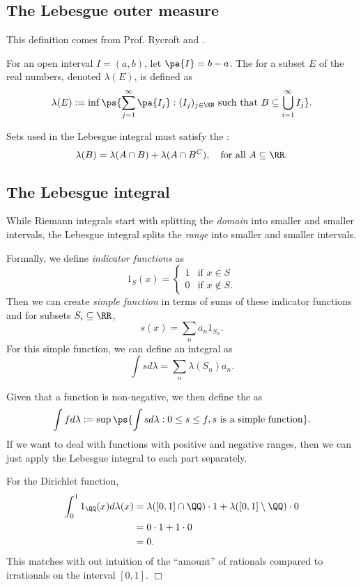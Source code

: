 \documentclass{scrartcl}
\newcommand{\qedwhite}{\hfill \ensuremath{\Box}}
\begin{document}
\subsection{The Lebesgue outer measure}

This definition comes from Prof. Rycroft and 
\cite{nlab:lebesgue_measure}.

\begin{definition}
    For an open interval $I=(a,b)$, let $\pa{I} = b-a$.
    The  for a subset $E$ of the real 
    numbers, denoted $\lambda(E)$, is defined as 
    \[
        \lambda(E) := \inf\ps{\sum_{j=1}^{\infty}\pa{I_j}: (I_j)_{j\in \NN} \text{ such that } B \subseteq \bigcup_{i=1}^\infty I_j}.
    \]
\end{definition}
Sets used in the Lebesgue integral must satisfy the :
\[
    \lambda(B) = \lambda(A\cap B) + \lambda(A\cap B^C), \quad \text{for all }A \subseteq\RR.
\]

\subsection{The Lebesgue integral}

While Riemann integrals start with splitting the \textit{domain} into smaller and smaller intervals, the Lebesgue integral 
splits the \textit{range} into smaller and smaller intervals.

Formally, we define \textit{indicator functions} as 
\[
    1_S(x) = \begin{cases}
        1 &\text{if }x\in S \\
        0 &\text{if }x\notin S.
    \end{cases}
\]
Then we can create \textit{simple function} in terms of sums of 
these indicator functions and for subsets $S_i \subseteq \RR$,
\[
    s(x) = \sum_{n}a_n1_{S_n}.
\]
For this simple function, we can define an integral as 
\[
    \int s d\lambda = \sum_{n}\lambda(S_n)a_n.
\]
\begin{definition}
    Given that a function is non-negative, we then define the 
     as 
    \[
        \int fd\lambda := \sup\ps{\int sd\lambda:0\leq s\leq f, s \text{ is a simple function}}.
    \]
    If we want to deal with functions with positive and negative ranges, 
    then we can just apply the Lebesgue integral to each part separately.
\end{definition}

\begin{example}
    For the Dirichlet function,
    \begin{align*}
        \int_{0}^{1}1_\QQ(x) d\lambda(x) &= \lambda([0,1]\cap \QQ)\cdot1  + \lambda([0,1]\setminus \QQ)\cdot 0 \\
        &= 0\cdot 1 + 1\cdot 0 \\
        &= 0.
    \end{align*}
    This matches with out intuition of the ``amount'' of rationals 
    compared to irrationals on the interval $[0,1]$.
    \qedwhite
\end{example}
\end{document}
